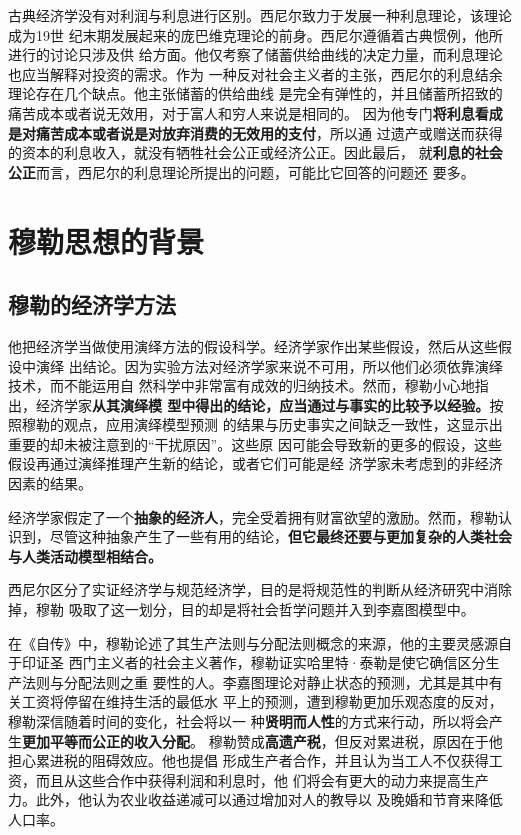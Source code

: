 古典经济学没有对利润与利息进行区别。西尼尔致力于发展一种利息理论，该理论成为19世
纪末期发展起来的庞巴维克理论的前身。西尼尔遵循着古典惯例，他所进行的讨论只涉及供
给方面。他仅考察了储蓄供给曲线的决定力量，而利息理论也应当解释对投资的需求。作为
一种反对社会主义者的主张，西尼尔的利息结余理论存在几个缺点。他主张储蓄的供给曲线
是完全有弹性的，并且储蓄所招致的痛苦成本或者说无效用，对于富人和穷人来说是相同的。
因为他专门\textbf{将利息看成是对痛苦成本或者说是对放弃消费的无效用的支付}，所以通
过遗产或赠送而获得的资本的利息收入，就没有牺牲社会公正或经济公正。因此最后，
就\textbf{利息的社会公正}而言，西尼尔的利息理论所提出的问题，可能比它回答的问题还
要多。

\section{穆勒思想的背景}

\subsection{穆勒的经济学方法}

他把经济学当做使用演绎方法的假设科学。经济学家作出某些假设，然后从这些假设中演绎
出结论。因为实验方法对经济学家来说不可用，所以他们必须依靠演绎技术，而不能运用自
然科学中非常富有成效的归纳技术。然而，穆勒小心地指出，经济学家\textbf{从其演绎模
  型中得出的结论，应当通过与事实的比较予以经验。}按照穆勒的观点，应用演绎模型预测
的结果与历史事实之间缺乏一致性，这显示出重要的却未被注意到的“干扰原因”。这些原
因可能会导致新的更多的假设，这些假设再通过演绎推理产生新的结论，或者它们可能是经
济学家未考虑到的非经济因素的结果。

经济学家假定了一个\textbf{抽象的经济人}，完全受着拥有财富欲望的激励。然而，穆勒认
识到，尽管这种抽象产生了一些有用的结论，\textbf{但它最终还要与更加复杂的人类社会
  与人类活动模型相结合。}

西尼尔区分了实证经济学与规范经济学，目的是将规范性的判断从经济研究中消除掉，穆勒
吸取了这一划分，目的却是将社会哲学问题并入到李嘉图模型中。

在《自传》中，穆勒论述了其生产法则与分配法则概念的来源，他的主要灵感源自于印证圣
西门主义者的社会主义著作，穆勒证实哈里特·泰勒是使它确信区分生产法则与分配法则之重
要性的人。李嘉图理论对静止状态的预测，尤其是其中有关工资将停留在维持生活的最低水
平上的预测，遭到穆勒更加乐观态度的反对，穆勒深信随着时间的变化，社会将以一
种\textbf{贤明而人性}的方式来行动，所以将会产生\textbf{更加平等而公正的收入分配}。
穆勒赞成\textbf{高遗产税}，但反对累进税，原因在于他担心累进税的阻碍效应。他也提倡
形成生产者合作，并且认为当工人不仅获得工资，而且从这些合作中获得利润和利息时，他
们将会有更大的动力来提高生产力。此外，他认为农业收益递减可以通过增加对人的教导以
及晚婚和节育来降低人口率。

